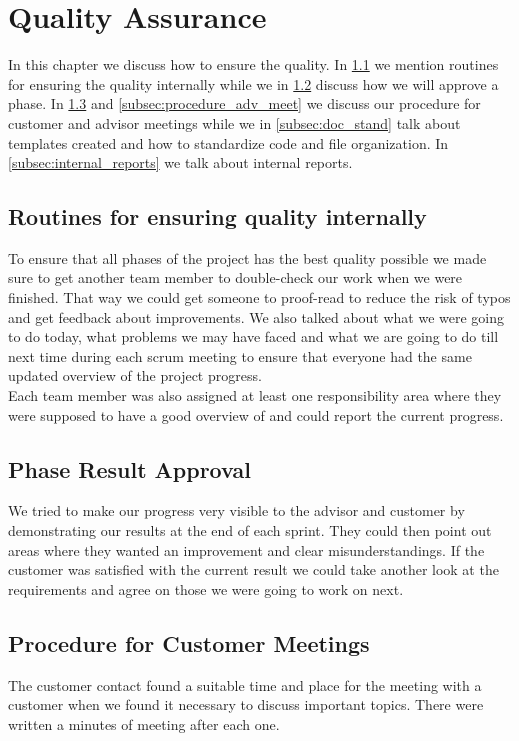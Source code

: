 \documentclass{report}
\begin{document}
\newpage
\section{Quality Assurance} \label{sec:quality_assurance}
In this chapter we discuss how to ensure the quality. In \ref{subsec:routines} we mention routines for ensuring the quality internally while we in \ref{subsec:phase_result} discuss how we will approve a phase. In \ref{subsec:procedure_cust_meet} and \ref{subsec:procedure_adv_meet} we discuss our procedure for customer and advisor meetings while we in \ref{subsec:doc_stand} talk about templates created and how to standardize code and file organization. In \ref{subsec:internal_reports} we talk about internal reports.

\subsection{Routines for ensuring quality internally} \label{subsec:routines}
To ensure that all phases of the project has the best quality possible we made sure to get another team member to double-check our work when we were finished. That way we could get someone to proof-read to reduce the risk of typos and get feedback about improvements. We also talked about what we were going to do today, what problems we may have faced and what we are going to do till next time during each scrum meeting to ensure that everyone had the same updated overview of the project progress.
\\
Each team member was also assigned at least one responsibility area where they were supposed to have a good overview of and could report the current progress.

\subsection{Phase Result Approval} \label{subsec:phase_result}
We tried to make our progress very visible to the advisor and customer by demonstrating our results at the end of each sprint. They could then point out areas where they wanted an improvement and clear misunderstandings. If the customer was satisfied with the current result we could take another look at the requirements and agree on those we were going to work on next.

\subsection{Procedure for Customer Meetings} \label{subsec:procedure_cust_meet}
The customer contact found a suitable time and place for the meeting with a customer when we found it necessary to discuss important topics. There were written a minutes of meeting after each one.
\end{document}
